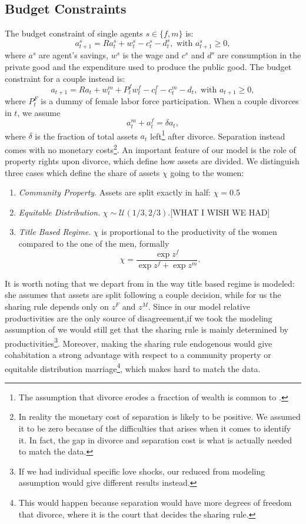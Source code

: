 \documentclass[12pt]{article}
\numberwithin{table}{section}
\begin{document}
\subsection{Budget Constraints}
The budget constraint of single agents  $s\in\{f,m\}$ is:
\begin{equation}\label{eq:bcs}
a^s_{t+1}=R a^s_t+w^s_t-c^s_t-d^s_t, \text{ with }a^s_{t+1}\geq0,
\end{equation}
where $a^s$ are agent's savings, $w^s$ is the wage and $c^s$ and $d^s$ are consumption in the private good and the expenditure used to produce the public good.
The budget constraint for a couple instead is:
\begin{equation}\label{eq:bcm}
a_{t+1}=R a_t+w^m_t+P^f_t w^f_t-c^f_t-c^m_t-d_t, \text{ with }a_{t+1}\geq0,
\end{equation}
where $P^F_t$ is a dummy of female labor force participation.
When a couple divorces in $t$, we assume 
\[a^m_t+a^f_t=\delta a_t,\]
where $\delta$ is the fraction of total assets $a_t$ left\footnote{The assumption that divorce erodes a fracction of wealth is common to \cite{cubeddu2003}.} after divorce. Separation instead comes with no monetary costs\footnote{In reality the monetary cost of separation is likely to be positive. We assumed it to be zero because of the difficulties that arises when it comes to identify it. In fact, the gap in divorce and separation cost is what is actually needed to match the data.}.
An important feature of our model is the role of property rights upon divorce, which define how assets are divided. We distinguish three cases which define the share of assets $\chi$ going to the women:
\begin{enumerate}
\item \textit{Community Property}. Assets are split exactly in half: $\chi=0.5$
\item \textit{Equitable Distribution}. $\chi\sim\mathcal{U}(1/3,2/3)$.[WHAT I WISH WE HAD]
\item \textit{Title Based Regime}. $\chi$ is proportional to the productivity of the women compared to the one of the men, formally
\[\chi=\frac{\exp{z^f}}{\exp{z^f}+\exp{z^m}}.\]
\end{enumerate}
It is worth noting that we depart from \cite{voena2015} in the way title based regime is modeled: she assumes that assets are split following a couple decision, while for us the sharing rule depends only on $z^F$ and $z^M$. Since in our model relative productivities are the only source of disagreement,if we took the modeling assumption of \cite{voena2015} we would still get that the sharing rule is mainly determined by productivities\footnote{If we had individual specific love shocks, our reduced from modeling assumption would give different results instead.}. Moreover, making the sharing rule endogenous would give cohabitation a strong advantage with respect to a community property or equitable distribution marriage\footnote{This would happen because separation would have more degrees of freedom that divorce, where it is the court that decides the sharing rule.}, which makes hard to match the data.  
\end{document}
